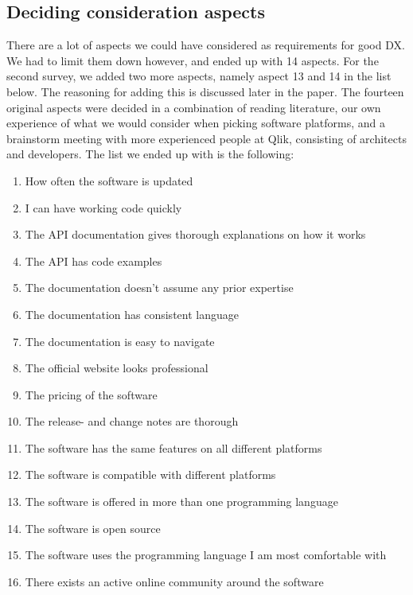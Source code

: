 \documentclass{article}
\begin{document}
\subsection{Deciding consideration aspects}

There are a lot of aspects we could have considered as requirements for
good DX. We had to limit them down however, and ended up with 14 aspects.
For the second survey, we added two more aspects, namely aspect 13 and 14 in the list below.
The reasoning for adding this is
discussed later in the paper. The fourteen original aspects were decided in a combination
of reading literature, our own experience of what we would consider when
picking software platforms, and a brainstorm meeting with more experienced
people at Qlik, consisting of architects and developers.
The list we ended up with is the following:

\begin{enumerate}
\item How often the software is updated
\item I can have working code quickly
\item The API documentation gives thorough explanations on how it works
\item The API has code examples
\item The documentation doesn't assume any prior expertise
\item The documentation has consistent language
\item The documentation is easy to navigate
\item The official website looks professional
\item The pricing of the software
\item  The release- and change notes are thorough
\item  The software has the same features on all different platforms
\item  The software is compatible with different platforms
\item  The software is offered in more than one programming language
\item  The software is open source
\item  The software uses the programming language I am most comfortable with
\item  There exists an active online community around the software
\end{enumerate}
\end{document}
